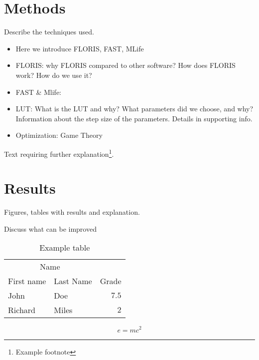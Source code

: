 \documentclass[twoside,twocolumn]{article}
\begin{document}
	\section{Methods}
	
	Describe the techniques used. 
	\begin{itemize}
		\item Here we introduce FLORIS, FAST, MLife
		\item FLORIS: why FLORIS compared to other software? How does FLORIS work? How do we use it?
		\item FAST \& Mlife:
		\item LUT: What is the LUT and why? What parameters did we choose, and why? Information about the step size of the parameters. Details in supporting info.
		\item Optimization: Game Theory
	\end{itemize}
	\blindtext %
	
	Text requiring further explanation\footnote{Example footnote}.
	
	
	\section{Results}
	
	Figures, tables with results and explanation.
	
	Discuss what can be improved
		
	\begin{table}
		\caption{Example table}
		\centering
		\begin{tabular}{llr}
			\toprule
			\multicolumn{2}{c}{Name} \\
			\cmidrule(r){1-2}
			First name & Last Name & Grade \\
			\midrule
			John & Doe & $7.5$ \\
			Richard & Miles & $2$ \\
			\bottomrule
		\end{tabular}
	\end{table}
	
	\blindtext %
	
	\begin{equation}
		\label{eq:emc}
		e = mc^2
	\end{equation}
	
	\blindtext %
	
	
\end{document}

